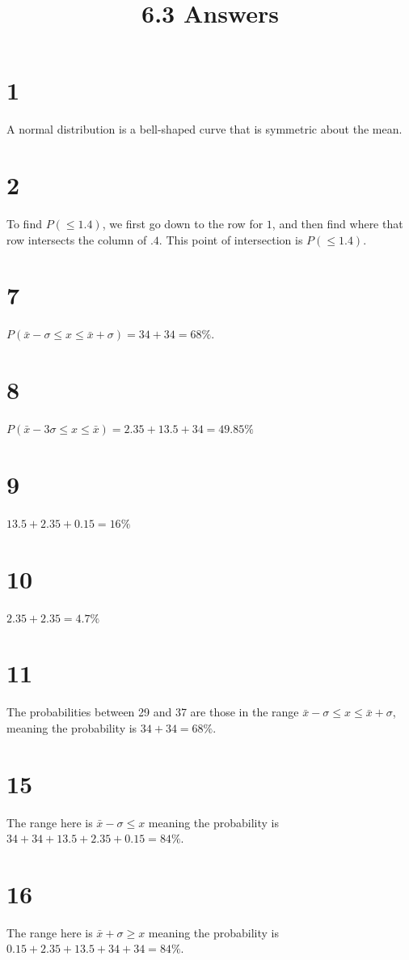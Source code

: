\documentclass{article}
\title{6.3 Answers}
\theoremstyle{definition}
\newcommand{\?}{\stackrel{?}{=}}
\begin{document}
\maketitle

\section*{1}
A normal distribution is a bell-shaped curve that is symmetric about the mean.

\section*{2}
To find $P(\le 1.4)$, we first go down to the row for $1$, and then find where that row intersects the column of $.4$. This point of intersection is $P(\le 1.4)$.

\section*{7}
$P(\bar{x}-\sigma\le x\le\bar{x}+\sigma)=34+34=68\%$.

\section*{8}
$P(\bar{x}-3\sigma\le x\le\bar{x})=2.35+13.5+34=49.85\%$

\section*{9}
$13.5+2.35+0.15=16\%$

\section*{10}
$2.35+2.35=4.7\%$

\section*{11}
The probabilities between 29 and 37 are those in the range $\bar{x}-\sigma\le x\le \bar{x}+\sigma$, meaning the probability is $34+34=68\%$.

\section*{15}
The range here is $\bar{x}-\sigma\le x$ meaning the probability is $34+34+13.5+2.35+0.15=84\%$.

\section*{16}
The range here is $\bar{x}+\sigma\ge x$ meaning the probability is $0.15+2.35+13.5+34+34=84\%$.
\end{document}
